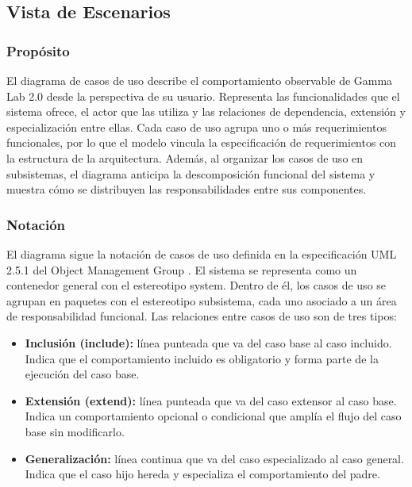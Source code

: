 \documentclass[11pt,a4paper]{article}
\DeclareRobustCommand{\_}{\textunderscore\allowbreak}
\begin{document}

\subsection{Vista de Escenarios}
\label{sec:vista_escenarios}

\subsubsection{Prop\'osito}

El diagrama de casos de uso describe el comportamiento observable de Gamma Lab 2.0 desde la perspectiva de su usuario. Representa las funcionalidades que el sistema ofrece, el actor que las utiliza y las relaciones de dependencia, extensi\'on y especializaci\'on entre ellas. Cada caso de uso agrupa uno o m\'as requerimientos funcionales, por lo que el modelo vincula la especificaci\'on de requerimientos con la estructura de la arquitectura. Adem\'as, al organizar los casos de uso en subsistemas, el diagrama anticipa la descomposici\'on funcional del sistema y muestra c\'omo se distribuyen las responsabilidades entre sus componentes.

\subsubsection{Notaci\'on}

El diagrama sigue la notaci\'on de casos de uso definida en la especificaci\'on UML 2.5.1 del Object Management Group \cite{omg_uml}. El sistema se representa como un contenedor general con el estereotipo \guillemotleft system\guillemotright. Dentro de \'el, los casos de uso se agrupan en paquetes con el estereotipo \guillemotleft subsistema\guillemotright, cada uno asociado a un \'area de responsabilidad funcional. Las relaciones entre casos de uso son de tres tipos:

\begin{itemize}
    \item \textbf{Inclusi\'on (\guillemotleft include\guillemotright):} l\'inea punteada que va del caso base al caso incluido. Indica que el comportamiento incluido es obligatorio y forma parte de la ejecuci\'on del caso base.
    \item \textbf{Extensi\'on (\guillemotleft extend\guillemotright):} l\'inea punteada que va del caso extensor al caso base. Indica un comportamiento opcional o condicional que ampl\'ia el flujo del caso base sin modificarlo.
    \item \textbf{Generalizaci\'on:} l\'inea continua que va del caso especializado al caso general. Indica que el caso hijo hereda y especializa el comportamiento del padre.
\end{itemize}
\end{document}
